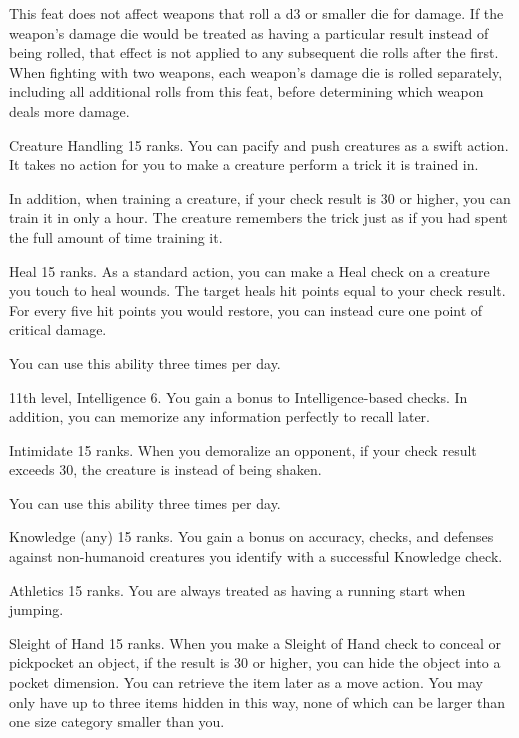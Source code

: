 This feat does not affect weapons that roll a d3 or smaller die for damage.
If the weapon's damage die would be treated as having a particular result instead of being rolled, that effect is not applied to any subsequent die rolls after the first.
When fighting with two weapons, each weapon's damage die is rolled separately, including all additional rolls from this feat, before determining which weapon deals more damage.

\featpre Creature Handling 15 ranks.
\featben You can pacify and push creatures as a swift action.
It takes no action for you to make a creature perform a trick it is trained in.

In addition, when training a creature, if your check result is 30 or higher, you can train it in only a hour.
The creature remembers the trick just as if you had spent the full amount of time training it.

\featpre Heal 15 ranks.
\featben As a standard action, you can make a Heal check on a creature you touch to heal wounds.
The target heals hit points equal to your check result.
For every five hit points you would restore, you can instead cure one point of critical damage.

You can use this ability three times per day.

\featpres 11th level, Intelligence 6.
\featben You gain a  bonus to Intelligence-based checks.
In addition, you can memorize any information perfectly to recall later.

\featpre Intimidate 15 ranks.
\featben When you demoralize an opponent, if your check result exceeds 30, the creature is \panicked instead of being shaken.

You can use this ability three times per day.

\featpre Knowledge (any) 15 ranks.
\featben You gain a  bonus on accuracy, checks, and defenses against non-humanoid creatures you identify with a successful Knowledge check.

\featpre Athletics 15 ranks.
\featben You are always treated as having a running start when jumping.

\featpre Sleight of Hand 15 ranks.
\featben When you make a Sleight of Hand check to conceal or pickpocket an object, if the result is 30 or higher, you can hide the object into a pocket dimension.
You can retrieve the item later as a move action.
You may only have up to three items hidden in this way, none of which can be larger than one size category smaller than you.

